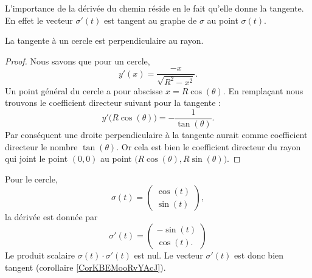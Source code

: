 L'importance de la dérivée du chemin réside en le fait qu'elle donne la tangente. En effet le vecteur $\sigma'(t)$ est tangent au graphe de $\sigma$ au point $\sigma(t)$.

\begin{corollary}       \label{CorKBEMooRvYAcJ}
    La tangente à un cercle est perpendiculaire au rayon.
\end{corollary}

\begin{proof}
    Nous savons que pour un cercle,
	\begin{equation}
		y'(x)=\frac{ -x }{ \sqrt{R^2-x^2} }.
	\end{equation}
	Un point général du cercle a pour abscisse $x=R\cos(\theta)$. En remplaçant nous trouvons le coefficient directeur suivant pour la tangente :
	\begin{equation}
		y'\big( R\cos(\theta) \big)=-\frac{1}{ \tan(\theta) }.
	\end{equation}
	Par conséquent une droite perpendiculaire à la tangente aurait comme coefficient directeur le nombre $\tan(\theta)$. Or cela est bien le coefficient directeur du rayon qui joint le point $(0,0)$ au point $\big( R\cos(\theta),R\sin(\theta) \big)$.

\end{proof}

\begin{example}
    Pour le cercle,
    \begin{equation}
        \sigma(t)=\begin{pmatrix}
            \cos(t)    \\ 
            \sin(t)    
        \end{pmatrix},
    \end{equation}
    la dérivée est donnée par
    \begin{equation}
        \sigma'(t)=\begin{pmatrix}
            -\sin(t)    \\ 
            \cos(t).    
        \end{pmatrix}
    \end{equation}
    Le produit scalaire $\sigma(t)\cdot \sigma'(t)$ est nul. Le vecteur $\sigma'(t)$ est donc bien tangent (corollaire \ref{CorKBEMooRvYAcJ}).
\end{example}

